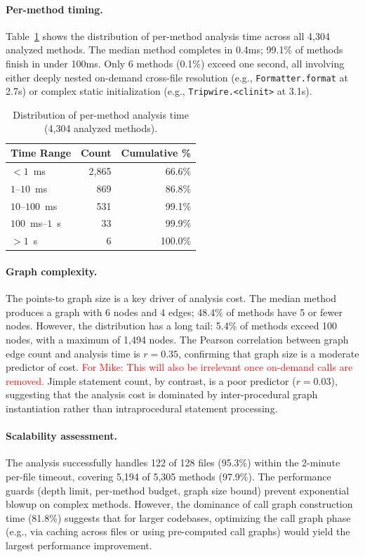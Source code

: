 \paragraph{Per-method timing.}
Table~\ref{tab:method-timing} shows the distribution of per-method analysis time across all 4,304 analyzed methods.
The median method completes in 0.4ms; 99.1\% of methods finish in under 100ms.
Only 6 methods (0.1\%) exceed one second, all involving either deeply nested on-demand cross-file resolution (e.g., \texttt{Formatter.format} at 2.7s) or complex static initialization (e.g., \texttt{Tripwire.<clinit>} at 3.1s).

\begin{table}[h]
\centering
\caption{Distribution of per-method analysis time (4,304 analyzed methods).}
\label{tab:method-timing}
\begin{tabular}{lrr}
\toprule
\textbf{Time Range} & \textbf{Count} & \textbf{Cumulative \%} \\
\midrule
$< 1$~ms          & 2,865 & 66.6\% \\
$1$--$10$~ms      &   869 & 86.8\% \\
$10$--$100$~ms    &   531 & 99.1\% \\
$100$~ms--$1$~s   &    33 & 99.9\% \\
$> 1$~s           &     6 & 100.0\% \\
\bottomrule
\end{tabular}
\end{table}

\paragraph{Graph complexity.}
The points-to graph size is a key driver of analysis cost.
The median method produces a graph with 6 nodes and 4 edges; 48.4\% of methods have 5 or fewer nodes.
However, the distribution has a long tail: 5.4\% of methods exceed 100 nodes, with a maximum of 1,494 nodes.
The Pearson correlation between graph edge count and analysis time is $r = 0.35$, confirming that graph size is a moderate predictor of cost. \textcolor{red}{For Mike: This will also be irrelevant once on-demand calls are removed.}
Jimple statement count, by contrast, is a poor predictor ($r = 0.03$), suggesting that the analysis cost is dominated by inter-procedural graph instantiation rather than intraprocedural statement processing.

\paragraph{Scalability assessment.}
The analysis successfully handles 122 of 128 files (95.3\%) within the 2-minute per-file timeout, covering 5,194 of 5,305 methods (97.9\%).
The performance guards (depth limit, per-method budget, graph size bound) prevent exponential blowup on complex methods.
However, the dominance of call graph construction time (81.8\%) suggests that for larger codebases, optimizing the call graph phase (e.g., via caching across files or using pre-computed call graphs) would yield the largest performance improvement.


